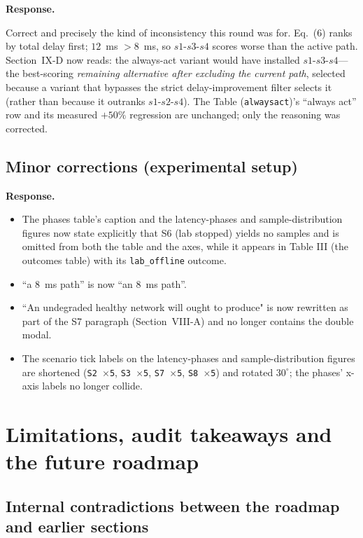 \documentclass[11pt,a4paper]{article}
\newenvironment{response}{\par\noindent\begin{minipage}{\linewidth}\small\textbf{Response.}\par}{\end{minipage}\medskip\par}
\begin{document}
\begin{response}
Correct and precisely the kind of inconsistency this round was for. Eq.~(6)
ranks by total delay first; $12$~ms $> 8$~ms, so $s1$-$s3$-$s4$ scores
worse than the active path. Section~IX-D now reads: the always-act variant
would have installed $s1$-$s3$-$s4$---the best-scoring \emph{remaining
alternative after excluding the current path}, selected because a variant
that bypasses the strict delay-improvement filter selects it (rather than
because it outranks $s1$-$s2$-$s4$). The Table (\texttt{alwaysact})'s
``always act'' row and its measured $+50\%$ regression are unchanged; only
the reasoning was corrected.
\end{response}

\subsection{Minor corrections (experimental setup)}

\begin{response}
\begin{itemize}
  \item The phases table's caption and the latency-phases and
    sample-distribution figures now state explicitly that S6 (lab stopped)
    yields no samples and is omitted from both the table and the axes, while
    it appears in Table III (the outcomes table) with its
    \texttt{lab\_offline} outcome.
  \item ``a $8$~ms path'' is now ``an $8$~ms path''.
  \item ``An undegraded healthy network will ought to produce" is now
    rewritten as part of the S7 paragraph (Section~VIII-A) and no longer
    contains the double modal.
  \item The scenario tick labels on the latency-phases and
    sample-distribution figures are shortened (\texttt{S2 $\times$5},
    \texttt{S3 $\times$5}, \texttt{S7 $\times$5}, \texttt{S8 $\times$5}) and
    rotated $30^{\circ}$; the phases' x-axis labels no longer collide.
\end{itemize}
\end{response}

\section{Limitations, audit takeaways and the future roadmap}

\subsection{Internal contradictions between the roadmap and earlier sections}
\end{document}
